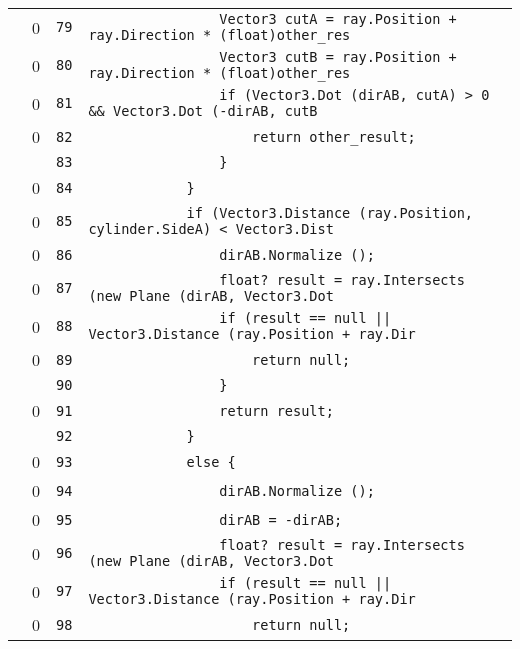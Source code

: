 \documentclass[a4paper,10pt]{article}
\begin{document}
\begin{longtable}[l]{lrrl}
\cellcolor{red} & 0 & \verb~79~ & \verb~                Vector3 cutA = ray.Position + ray.Direction * (float)other_res~\\
\cellcolor{red} & 0 & \verb~80~ & \verb~                Vector3 cutB = ray.Position + ray.Direction * (float)other_res~\\
\cellcolor{red} & 0 & \verb~81~ & \verb~                if (Vector3.Dot (dirAB, cutA) > 0 && Vector3.Dot (-dirAB, cutB~\\
\cellcolor{red} & 0 & \verb~82~ & \verb~                    return other_result;~\\
\cellcolor{gray} &  & \verb~83~ & \verb~                }~\\
\cellcolor{red} & 0 & \verb~84~ & \verb~            }~\\
\cellcolor{red} & 0 & \verb~85~ & \verb~            if (Vector3.Distance (ray.Position, cylinder.SideA) < Vector3.Dist~\\
\cellcolor{red} & 0 & \verb~86~ & \verb~                dirAB.Normalize ();~\\
\cellcolor{red} & 0 & \verb~87~ & \verb~                float? result = ray.Intersects (new Plane (dirAB, Vector3.Dot ~\\
\cellcolor{red} & 0 & \verb~88~ & \verb~                if (result == null || Vector3.Distance (ray.Position + ray.Dir~\\
\cellcolor{red} & 0 & \verb~89~ & \verb~                    return null;~\\
\cellcolor{gray} &  & \verb~90~ & \verb~                }~\\
\cellcolor{red} & 0 & \verb~91~ & \verb~                return result;~\\
\cellcolor{gray} &  & \verb~92~ & \verb~            }~\\
\cellcolor{red} & 0 & \verb~93~ & \verb~            else {~\\
\cellcolor{red} & 0 & \verb~94~ & \verb~                dirAB.Normalize ();~\\
\cellcolor{red} & 0 & \verb~95~ & \verb~                dirAB = -dirAB;~\\
\cellcolor{red} & 0 & \verb~96~ & \verb~                float? result = ray.Intersects (new Plane (dirAB, Vector3.Dot ~\\
\cellcolor{red} & 0 & \verb~97~ & \verb~                if (result == null || Vector3.Distance (ray.Position + ray.Dir~\\
\cellcolor{red} & 0 & \verb~98~ & \verb~                    return null;~\\

\end{longtable}
\end{document}
